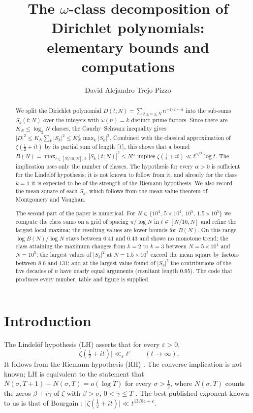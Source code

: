 \documentclass[11pt]{amsart}
\title[The $\omega$-class decomposition]{The $\omega$-class decomposition of
Dirichlet polynomials:\\ elementary bounds and computations}
\author{David Alejandro Trejo Pizzo}
\theoremstyle{definition}
\theoremstyle{remark}
\newcommand{\half}{\tfrac{1}{2}}
\newcommand{\abs}[1]{\lvert #1 \rvert}
\begin{document}
\begin{abstract}
We split the Dirichlet polynomial
$D(t;N)=\sum_{2\le n\le N} n^{-1/2-it}$ into the sub-sums $S_k(t;N)$ over the
integers with $\omega(n)=k$ distinct prime factors.  Since there are
$K_N\le\log_2 N$ classes, the Cauchy--Schwarz inequality gives
$|D|^2\le K_N\sum_k|S_k|^2\le K_N^2\max_k|S_k|^2$.  Combined with the
classical approximation of $\zeta(\half+it)$ by its partial sum of length
$\lceil t\rceil$, this shows that a bound
$B(N)=\max_{t\in[N/10,N],\,k}|S_k(t;N)|^2\le N^{\alpha}$ implies
$\zeta(\half+it)\ll t^{\alpha/2}\log t$.  The implication uses only the
number of classes.  The hypothesis for every $\alpha>0$ is sufficient for
the Lindel\"of hypothesis; it is not known to follow from it, and already
for the class $k=1$ it is expected to be of the strength of the Riemann
hypothesis.  We also record the mean square of each $S_k$, which follows
from the mean value theorem of Montgomery and Vaughan.

The second part of the paper is numerical.  For
$N\in\{10^4,\,5\times10^4,\,10^5,\,1.5\times10^5\}$ we compute the class
sums on a grid of spacing $\pi/\log N$ in $t\in[N/10,N]$ and refine the
largest local maxima; the resulting values are lower bounds for $B(N)$.
On this range $\log B(N)/\log N$ stays between $0.41$ and $0.43$ and shows
no monotone trend; the class attaining the maximum changes from $k=2$ to
$k=3$ between $N=5\times10^4$ and $N=10^5$; the largest values of
$|S_k|^2$ at $N=1.5\times10^5$ exceed the mean square by factors between
$8.6$ and $131$; and at
the largest value found of $|S_3|^2$ the contributions of the five decades
of $n$ have nearly equal arguments (resultant length $0.95$).  The code
that produces every number, table and figure is supplied.
\end{abstract}

\maketitle

\section{Introduction}\label{sec:intro}
The Lindel\"of hypothesis (LH) asserts that for every $\varepsilon > 0$,
\begin{equation}\label{eq:lindelof}
  \abs{\zeta(\half + it)} \ll_\varepsilon t^\varepsilon
  \qquad (t \to \infty).
\end{equation}
It follows from the Riemann hypothesis (RH) \cite[\S14.2]{titchmarsh1986}.
The converse implication is not known; LH is equivalent to the statement
that $N(\sigma,T+1)-N(\sigma,T)=o(\log T)$ for every $\sigma>\half$, where
$N(\sigma,T)$ counts the zeros $\beta+i\gamma$ of $\zeta$ with
$\beta>\sigma$, $0<\gamma\le T$ \cite[Theorem~13.5]{titchmarsh1986}.
The best published exponent known to us is that of Bourgain
\cite{bourgain2017}: $\abs{\zeta(\half+it)} \ll t^{13/84+\varepsilon}$.
\end{document}

